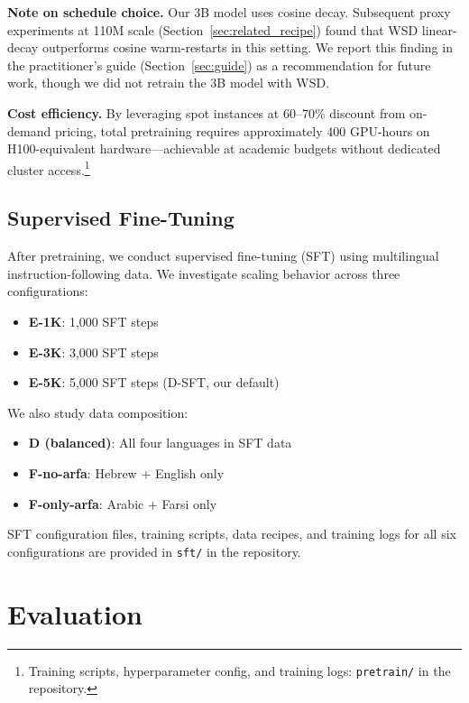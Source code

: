 \documentclass[10pt,twocolumn]{article}
\begin{document}
\textbf{Note on schedule choice.} Our 3B model uses cosine decay. Subsequent proxy experiments at 110M scale (Section~\ref{sec:related_recipe}) found that WSD linear-decay outperforms cosine warm-restarts in this setting. We report this finding in the practitioner's guide (Section~\ref{sec:guide}) as a recommendation for future work, though we did not retrain the 3B model with WSD.

\textbf{Cost efficiency.} By leveraging spot instances at 60--70\% discount from on-demand pricing, total pretraining requires approximately 400 GPU-hours on H100-equivalent hardware---achievable at academic budgets without dedicated cluster access.\footnote{Training scripts, hyperparameter config, and training logs: \texttt{pretrain/} in the repository.}

\subsection{Supervised Fine-Tuning}

After pretraining, we conduct supervised fine-tuning (SFT) using multilingual instruction-following data. We investigate scaling behavior across three configurations:

\begin{itemize}
    \item \textbf{E-1K}: 1,000 SFT steps
    \item \textbf{E-3K}: 3,000 SFT steps  
    \item \textbf{E-5K}: 5,000 SFT steps (D-SFT, our default)
\end{itemize}

We also study data composition:
\begin{itemize}
    \item \textbf{D (balanced)}: All four languages in SFT data
    \item \textbf{F-no-arfa}: Hebrew + English only
    \item \textbf{F-only-arfa}: Arabic + Farsi only
\end{itemize}

\noindent SFT configuration files, training scripts, data recipes, and training logs for all six configurations are provided in \texttt{sft/} in the repository.

\section{Evaluation}
\end{document}
